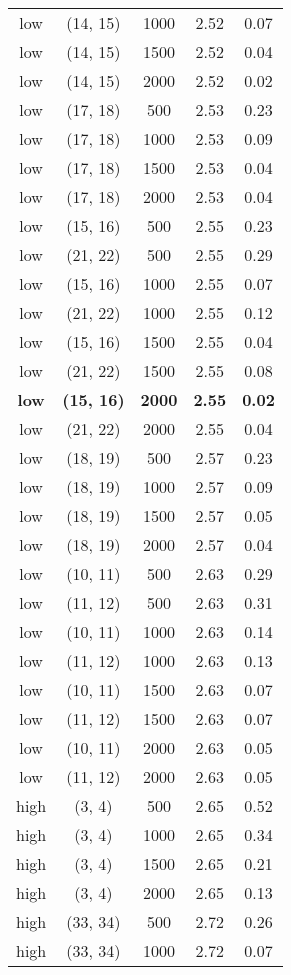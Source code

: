 \begin{tabular}{c c c c c}
low & (14, 15) &  1000 & 2.52 & 0.07 \\
low & (14, 15) &  1500 & 2.52 & 0.04 \\
low & (14, 15) &  2000 & 2.52 & 0.02 \\
low & (17, 18) &  500 & 2.53 & 0.23 \\
low & (17, 18) &  1000 & 2.53 & 0.09 \\
low & (17, 18) &  1500 & 2.53 & 0.04 \\
low & (17, 18) &  2000 & 2.53 & 0.04 \\
low & (15, 16) &  500 & 2.55 & 0.23 \\
low & (21, 22) &  500 & 2.55 & 0.29 \\
low & (15, 16) &  1000 & 2.55 & 0.07 \\
low & (21, 22) &  1000 & 2.55 & 0.12 \\
low & (15, 16) &  1500 & 2.55 & 0.04 \\
low & (21, 22) &  1500 & 2.55 & 0.08 \\
\textbf{low} & \textbf{(15, 16)} & \textbf{ 2000} & \textbf{2.55} & \textbf{0.02} \\
low & (21, 22) &  2000 & 2.55 & 0.04 \\
low & (18, 19) &  500 & 2.57 & 0.23 \\
low & (18, 19) &  1000 & 2.57 & 0.09 \\
low & (18, 19) &  1500 & 2.57 & 0.05 \\
low & (18, 19) &  2000 & 2.57 & 0.04 \\
low & (10, 11) &  500 & 2.63 & 0.29 \\
low & (11, 12) &  500 & 2.63 & 0.31 \\
low & (10, 11) &  1000 & 2.63 & 0.14 \\
low & (11, 12) &  1000 & 2.63 & 0.13 \\
low & (10, 11) &  1500 & 2.63 & 0.07 \\
low & (11, 12) &  1500 & 2.63 & 0.07 \\
low & (10, 11) &  2000 & 2.63 & 0.05 \\
low & (11, 12) &  2000 & 2.63 & 0.05 \\
high & (3, 4) &  500 & 2.65 & 0.52 \\
high & (3, 4) &  1000 & 2.65 & 0.34 \\
high & (3, 4) &  1500 & 2.65 & 0.21 \\
high & (3, 4) &  2000 & 2.65 & 0.13 \\
high & (33, 34) &  500 & 2.72 & 0.26 \\
high & (33, 34) &  1000 & 2.72 & 0.07 \\

\end{tabular}
